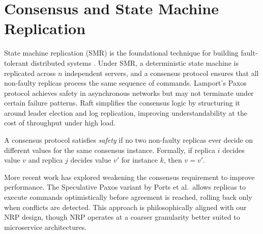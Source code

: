 \section{Consensus and State Machine Replication}

State machine replication (SMR) is the foundational technique for building fault-tolerant distributed systems \cite{schneider1990}. Under SMR, a deterministic state machine is replicated across $n$ independent servers, and a consensus protocol ensures that all non-faulty replicas process the same sequence of commands. Lamport's Paxos protocol \cite{lamport2001} achieves safety in asynchronous networks but may not terminate under certain failure patterns. Raft \cite{ongaro2014} simplifies the consensus logic by structuring it around leader election and log replication, improving understandability at the cost of throughput under high load.

\begin{defbox}[title=Consensus Safety]
A consensus protocol satisfies \textit{safety} if no two non-faulty replicas ever decide on different values for the same consensus instance. Formally, if replica $i$ decides value $v$ and replica $j$ decides value $v'$ for instance $k$, then $v = v'$.
\end{defbox}

More recent work has explored weakening the consensus requirement to improve performance. The Speculative Paxos variant by Ports et al.\ allows replicas to execute commands optimistically before agreement is reached, rolling back only when conflicts are detected. This approach is philosophically aligned with our NRP design, though NRP operates at a coarser granularity better suited to microservice architectures.
